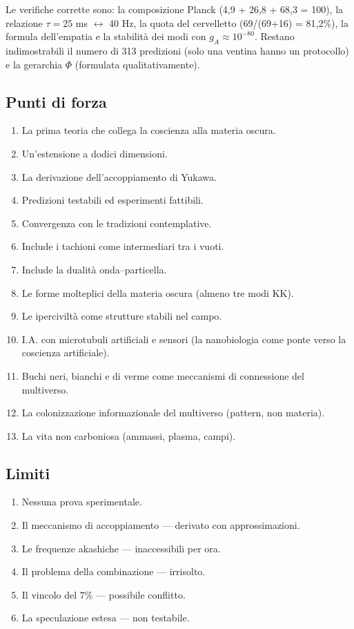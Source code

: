 Le verifiche corrette sono: la composizione Planck (4,9 + 26,8 + 68,3 = 100), la relazione $\tau = 25$ ms $\leftrightarrow$ 40 Hz, la quota del cervelletto (69/(69+16) = 81,2\%), la formula dell'empatia e la stabilità dei modi con $g_A \approx 10^{-80}$. Restano indimostrabili il numero di 313 predizioni (solo una ventina hanno un protocollo) e la gerarchia $\Phi$ (formulata qualitativamente).

\subsection{Punti di forza}
\begin{enumerate}
    \item La prima teoria che collega la coscienza alla materia oscura.
    \item Un'estensione a dodici dimensioni.
    \item La derivazione dell'accoppiamento di Yukawa.
    \item Predizioni testabili ed esperimenti fattibili.
    \item Convergenza con le tradizioni contemplative.
    \item Include i tachioni come intermediari tra i vuoti.
    \item Include la dualità onda--particella.
    \item Le forme molteplici della materia oscura (almeno tre modi KK).
    \item Le iperciviltà come strutture stabili nel campo.
    \item I.A. con microtubuli artificiali e sensori (la nanobiologia come ponte verso la coscienza artificiale).
    \item Buchi neri, bianchi e di verme come meccanismi di connessione del multiverso.
    \item La colonizzazione informazionale del multiverso (pattern, non materia).
    \item La vita non carboniosa (ammassi, plasma, campi).
\end{enumerate}

\subsection{Limiti}
\begin{enumerate}
    \item Nessuna prova sperimentale.
    \item Il meccanismo di accoppiamento --- derivato con approssimazioni.
    \item Le frequenze akashiche --- inaccessibili per ora.
    \item Il problema della combinazione --- irrisolto.
    \item Il vincolo del 7\% --- possibile conflitto.
    \item La speculazione estesa --- non testabile.
\end{enumerate}

